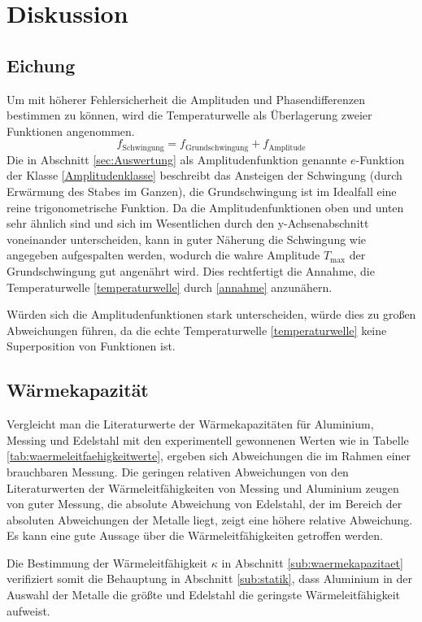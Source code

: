 \section{Diskussion}
\label{sec:Diskussion}
\subsection{Eichung}
Um mit höherer Fehlersicherheit die Amplituden und Phasendifferenzen bestimmen zu können, wird die Temperaturwelle als Überlagerung zweier Funktionen angenommen. 
\begin{equation}
	\label{annahme}
	f_\text{Schwingung}= f_\text{Grundschwingung}+f_\text{Amplitude}
\end{equation}
Die in Abschnitt \ref{sec:Auswertung} als Amplitudenfunktion genannte $e$-Funktion der Klasse \eqref{Amplitudenklasse} beschreibt das Ansteigen der Schwingung (durch Erwärmung des Stabes im Ganzen), die Grundschwingung ist im Idealfall eine reine trigonometrische Funktion. 
Da die Amplitudenfunktionen oben und unten sehr ähnlich sind und sich im Wesentlichen durch den y-Achsenabschnitt voneinander unterscheiden, kann in guter Näherung die Schwingung wie angegeben aufgespalten werden, wodurch die wahre Amplitude $T_\text{max}$ der Grundschwingung gut angenährt wird.
Dies rechtfertigt die Annahme, die Temperaturwelle \ref{temperaturwelle} durch \eqref{annahme} anzunähern.

Würden sich die Amplitudenfunktionen stark unterscheiden, würde dies zu großen Abweichungen führen, da die echte Temperaturwelle \ref{temperaturwelle} keine Superposition von Funktionen ist.

\subsection{Wärmekapazität}
Vergleicht man die Literaturwerte der Wärmekapazitäten für Aluminium, Messing und Edelstahl mit den experimentell gewonnenen Werten wie in Tabelle \ref{tab:waermeleitfaehigkeitwerte}, ergeben sich Abweichungen die im Rahmen einer brauchbaren Messung.
Die geringen relativen Abweichungen von den Literaturwerten der Wärmeleitfähigkeiten von Messing und Aluminium zeugen von guter Messung, 
die absolute Abweichung von Edelstahl, der im Bereich der absoluten Abweichungen der Metalle liegt, zeigt eine höhere relative Abweichung.
Es kann eine gute Aussage über die Wärmeleitfähigkeiten getroffen werden.

Die Bestimmung der Wärmeleitfähigkeit $\kappa$ in Abschnitt \ref{sub:waermekapazitaet} verifiziert somit die Behauptung in Abschnitt \ref{sub:statik}, dass Aluminium in der Auswahl der Metalle die größte und Edelstahl die geringste Wärmeleitfähigkeit aufweist.

